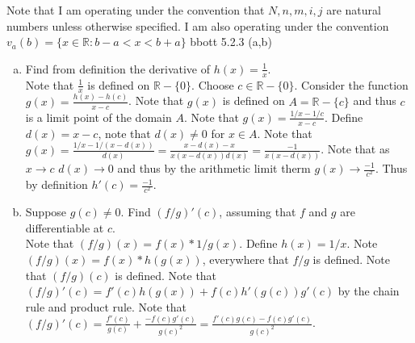 \documentclass[12pt]{article}
\makeatletter
\theoremstyle{homework}
\newenvironment{exercise}[1]
{\def\@currentlabel{#1}\exercisecore}
{\endexercisecore}
\makeatother
\begin{document}
Note that I am operating under the convention that $N,n,m,i,j$ are natural numbers unless otherwise specified.  I am also operating under the convention $v_a(b)=\{x\in\mathbb{R}:b-a<x<b+a\}$
\begin{exercise}

Abbott 5.2.3 (a,b)
\end{exercise}
\begin{enumerate}[(a)]
\item
Find from definition the derivative of $h(x)=\frac{1}{x}$.\\
Note that $\frac{1}{x}$ is defined on $\mathbb{R}-\{0\}$.  Choose $c\in \mathbb{R}-\{0\}$.  Consider the function $g(x)=\frac{h(x)-h(c)}{x-c}$.  Note that $g(x)$ is defined on $A=\mathbb{R}-\{c\}$ and thus $c$ is a limit point of the domain $A$.  Note that $g(x)=\frac{1/x-1/c}{x-c}$.  Define $d(x)=x-c$, note that $d(x)\neq 0$ for $x\in A$.  Note that $g(x)=\frac{1/x-1/(x-d(x))}{d(x)}=\frac{x-d(x)-x}{x(x-d(x))d(x)}=\frac{-1}{x(x-d(x))}$.  Note that as $x\rightarrow c$ $d(x)\rightarrow 0$ and thus by the arithmetic limit therm $g(x)\rightarrow \frac{-1}{c^2}$.  Thus by definition $h'(c)=\frac{-1}{c^2}$.
\item
Suppose $g(c)\neq 0$.  Find $(f/g)'(c)$, assuming that $f$ and $g$ are differentiable at $c$.\\
Note that $(f/g)(x)=f(x)*1/g(x)$.  Define $h(x)=1/x$.  Note $(f/g)(x)=f(x)*h(g(x))$, everywhere that $f/g$ is defined.  Note that $(f/g)(c)$ is defined.  Note that $(f/g)'(c)=f'(c)h(g(x))+f(c)h'(g(c))g'(c)$ by the chain rule and product rule.  Note that $(f/g)'(c)=\frac{f'(c)}{g(c)}+\frac{-f(c)g'(c)}{g(c)^2}=\frac{f'(c)g(c)-f(c)g'(c)}{g(c)^2}$.

\end{enumerate}
\end{document}
